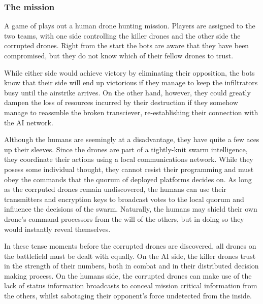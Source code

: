 \subsubsection*{The mission}

A game of \DDD{} plays out a human drone hunting mission.
Players are assigned to the two teams, with one side controlling the killer drones and the other side the corrupted drones.
Right from the start the bots are aware that they have been compromised, but they do not know which of their fellow drones to trust.

While either side would achieve victory by eliminating their opposition, the bots know that their side will end up victorious if they manage to keep the infiltrators busy until the airstrike arrives.
On the other hand, however, they could greatly dampen the loss of resources incurred by their destruction if they somehow manage to reassmble the broken transciever, re-establishing their connection with the AI network.

Although the humans are seemingly at a disadvantage, they have quite a few aces up their sleeves.
Since the drones are part of a tightly-knit swarm intelligence, they coordinate their actions using a local communications network.
While they posess some individual thought, they cannot resist their programming and must obey the commands that the quorum of deployed platforms decides on.
As long as the corrputed drones remain undiscovered, the humans can use their transmitters and encryption keys to broadcast votes to the local quorum and influence the decisions of the swarm.
Naturally, the humans may shield their own drone's command processors from the will of the others, but in doing so they would instantly reveal themselves.

In these tense moments before the corrupted drones are discovered, all drones on the battlefield must be dealt with equally.
On the AI side, the killer drones trust in the strength of their numbers, both in combat and in their distributed decision making process.
On the humans side, the corrupted drones can make use of the lack of status information broadcasts to conceal mission critical information from the others, whilst sabotaging their opponent's force undetected from the inside.